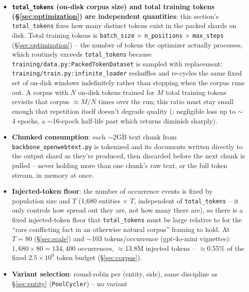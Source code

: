 \documentclass[11pt]{article}
\begin{document}
\begin{itemize}
    circular dependency, since injected-text length varies per
    LLM-authored variant and is not known until generation time.
  \item \label{sec:corpus-vs-training-tokens} \textbf{\texttt{total\_tokens}
    (on-disk corpus size) and total training tokens (\S\ref{sec:optimization})
    are independent quantities}: this section's \texttt{total\_tokens} fixes
    how many distinct tokens exist in the packed shards on disk. Total
    training tokens is \texttt{batch\_size} $\times$ \texttt{n\_positions}
    $\times$ \texttt{max\_steps} (\S\ref{sec:optimization}) -- the number of
    tokens the optimizer actually processes, which routinely exceeds
    \texttt{total\_tokens} because
    \texttt{training/data.py:PackedTokenDataset} is sampled with
    replacement: \texttt{training/train.py:infinite\_loader} reshuffles and
    re-cycles the same fixed set of on-disk windows indefinitely rather than
    stopping when the corpus runs out. A corpus with $N$ on-disk tokens
    trained for $M$ total training tokens revisits that corpus
    $\approx M/N$ times over the run; this ratio must stay small enough that
    repetition itself doesn't degrade quality
    (\citet{muennighoff2023scaling}: negligible loss up to $\sim$4 epochs, a
    $\sim$16-epoch half-life past which returns diminish sharply).
  \item \textbf{Chunked consumption}: each $\sim$2GB text chunk from
    \texttt{backbone\_openwebtext.py} is tokenized and its documents written
    directly to the output shard as they're produced, then discarded before
    the next chunk is pulled -- never holding more than one chunk's raw
    text, or the full token stream, in memory at once.
  \item \textbf{Injected-token floor}: the number of occurrence events is
    fixed by population size and $T$ (1{,}680 entities $\times$ $T$,
    independent of \texttt{total\_tokens} -- it only controls how spread out
    they are, not how many there are), so there is a fixed injected-token
    floor that \texttt{total\_tokens} must be large relative to for the
    ``rare conflicting fact in an otherwise natural corpus'' framing to
    hold. At $T=80$ (\S\ref{sec:scale}) and $\sim$103 tokens/occurrence
    (gpt-4o-mini vignettes): $1{,}680 \times 80 = 134{,}400$ occurrences,
    $\approx$13.8M injected tokens -- $\approx$0.55\% of the fixed
    $2.5\times10^9$ token budget (\S\ref{sec:corpus}).
  \item \textbf{Variant selection}: round-robin per (entity, side), same
    discipline as \S\ref{sec:entity} (\texttt{PoolCycler}) -- no variant

\end{itemize}
\end{document}
